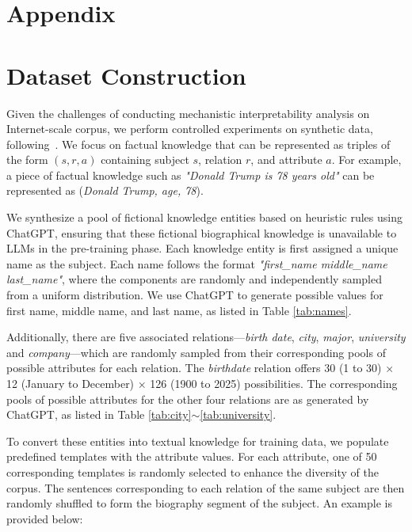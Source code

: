 \newpage
\appendix
\section*{Appendix}

\section{Dataset Construction}
\label{app:dataset}

Given the challenges of conducting mechanistic interpretability analysis on Internet-scale corpus, we perform controlled experiments on synthetic data, following~\citet{physics3.1,physics3.2,physics3.3}.
We focus on factual knowledge that can be represented as triples of the form $(s, r ,a)$ containing subject $s$, relation $r$, and attribute $a$.
For example, a piece of factual knowledge such as \textit{"Donald Trump is 78 years old"} can be represented as (\textit{Donald Trump, age, 78}).

We synthesize a pool of fictional knowledge entities based on heuristic rules using ChatGPT, ensuring that these fictional biographical knowledge is unavailable to LLMs in the pre-training phase.
Each knowledge entity is first assigned a unique name as the subject.
Each name follows the format \textit{"first\_name middle\_name last\_name"}, where the components are randomly and independently sampled from a uniform distribution.
We use ChatGPT to generate possible values for first name, middle name, and last name,  as listed in Table \ref{tab:names}.

Additionally, there are five associated relations—\textit{birth date}, \textit{city}, \textit{major}, \textit{university} and \textit{company}—which are randomly sampled from their corresponding pools of possible attributes for each relation.
The \textit{birthdate} relation offers 30 (1 to 30) × 12 (January to December) × 126 (1900 to 2025) possibilities.
The corresponding pools of possible attributes for the other four relations are as generated by ChatGPT, as listed in Table \ref{tab:city}$\sim$\ref{tab:university}. 

To convert these entities into textual knowledge for training data, we populate predefined templates with the attribute values.
For each attribute, one of 50 corresponding templates is randomly selected to enhance the diversity of the corpus.
The sentences corresponding to each relation of the same subject are then randomly shuffled to form the biography segment of the subject.
An example is provided below:

